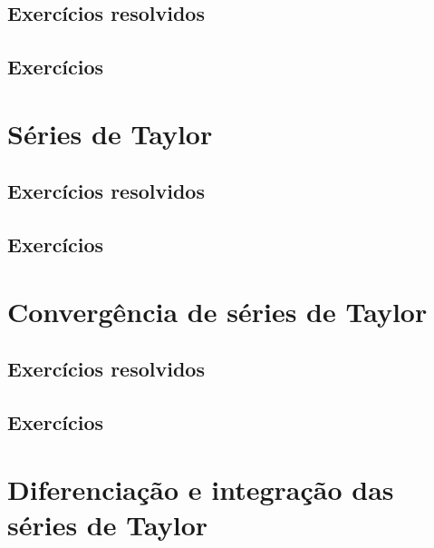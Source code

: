 \subsection*{Exercícios resolvidos}

\construirExeresol


\subsection*{Exercícios}

\construirExer


\section{Séries de Taylor}
\construirSec

\subsection*{Exercícios resolvidos}

\construirExeresol


\subsection*{Exercícios}

\construirExer


\section{Convergência de séries de Taylor}
\construirSec

\subsection*{Exercícios resolvidos}

\construirExeresol


\subsection*{Exercícios}

\construirExer


\section{Diferenciação e integração das séries de Taylor}
\construirSec

